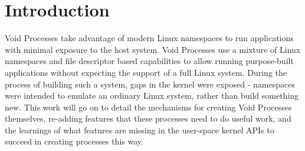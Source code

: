 \documentclass[sigplan]{acmart}
\begin{document}



\maketitle

\section{Introduction}

Void Processes take advantage of modern Linux namespaces to run applications with minimal exposure to the host system. Void Processes use a mixture of Linux namespaces and file descriptor based capabilities to allow running purpose-built applications without expecting the support of a full Linux system. During the process of building such a system, gaps in the kernel were exposed - namespaces were intended to emulate an ordinary Linux system, rather than build something new. This work will go on to detail the mechanisms for creating Void Processes themselves, re-adding features that these processes need to do useful work, and the learnings of what features are missing in the user-space kernel APIs to succeed in creating processes this way.

\end{document}
